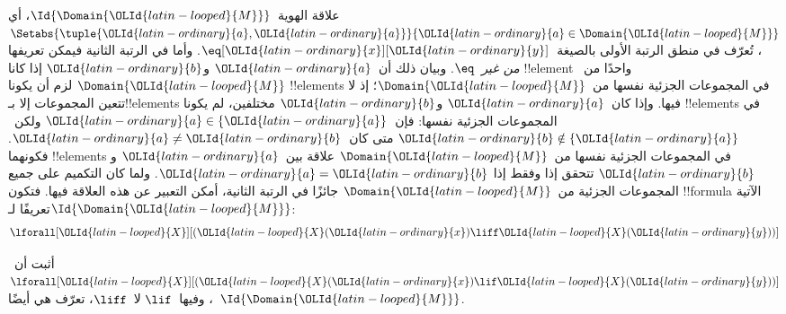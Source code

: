 \documentclass[../../../include/open-logic-section]{subfiles}
\begin{document}
\begin{ex}
علاقة الهوية~$\Id{\Domain{\OLId{latin-looped}{M}}}$، أي
$\Setabs{\tuple{\OLId{latin-ordinary}{a},\OLId{latin-ordinary}{a}}}{\OLId{latin-ordinary}{a} \in \Domain{\OLId{latin-looped}{M}}}$، تُعرّف في منطق
الرتبة الأولى بالصيغة~$\eq[\OLId{latin-ordinary}{x}][\OLId{latin-ordinary}{y}]$. وأما في الرتبة الثانية فيمكن
تعريفها \emph{من غير~$\eq$}. وبيان ذلك أن~$\OLId{latin-ordinary}{a}$ و$\OLId{latin-ordinary}{b}$ إذا كانا
!!{element} واحدًا من~$\Domain{\OLId{latin-looped}{M}}$ لزم أن يكونا !!{element}s
في المجموعات الجزئية نفسها من~$\Domain{\OLId{latin-looped}{M}}$؛ إذ لا تتعين المجموعات
إلا بـ!!{element}s فيها. وإذا كان~$\OLId{latin-ordinary}{a}$ و$\OLId{latin-ordinary}{b}$ مختلفين، لم يكونا
!!{element}s في المجموعات الجزئية نفسها: فإن~$\OLId{latin-ordinary}{a} \in \{\OLId{latin-ordinary}{a}\}$
ولكن~$\OLId{latin-ordinary}{b} \notin \{\OLId{latin-ordinary}{a}\}$ متى كان~$\OLId{latin-ordinary}{a} \neq \OLId{latin-ordinary}{b}$.
فكونهما !!{element}s في المجموعات الجزئية نفسها
من~$\Domain{\OLId{latin-looped}{M}}$ علاقة بين~$\OLId{latin-ordinary}{a}$ و$\OLId{latin-ordinary}{b}$ تتحقق إذا وفقط إذا
$\OLId{latin-ordinary}{a} = \OLId{latin-ordinary}{b}$. ولما كان التكميم على جميع المجموعات الجزئية
من~$\Domain{\OLId{latin-looped}{M}}$ جائزًا في الرتبة الثانية، أمكن التعبير عن هذه
العلاقة فيها. فتكون !!{formula} الآتية تعريفًا
لـ$\Id{\Domain{\OLId{latin-looped}{M}}}$:
\[
\lforall[\OLId{latin-looped}{X}][(\OLId{latin-looped}{X}(\OLId{latin-ordinary}{x}) \liff \OLId{latin-looped}{X}(\OLId{latin-ordinary}{y}))]
\]
\end{ex}

\begin{prob}
أثبت أن~$\lforall[\OLId{latin-looped}{X}][(\OLId{latin-looped}{X}(\OLId{latin-ordinary}{x}) \lif \OLId{latin-looped}{X}(\OLId{latin-ordinary}{y}))]$، وفيها~$\lif$
لا~$\liff$، تعرّف هي أيضًا~$\Id{\Domain{\OLId{latin-looped}{M}}}$.
\end{prob}
\end{document}
